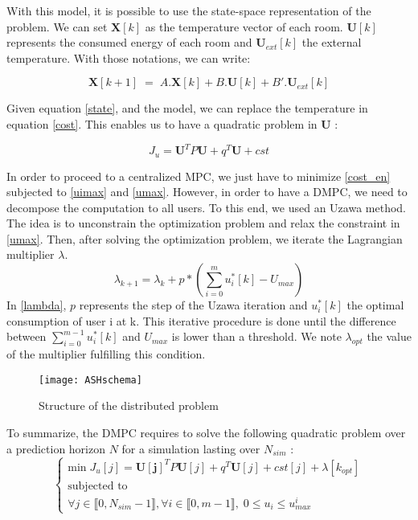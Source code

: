 \documentclass[conference, peerreview]{IEEEtran}
\begin{document}
With this model, it is possible to use the state-space representation of the problem. We can  set $\bm{X}[k]$ as the temperature vector of each room. $\bm{U}[k]$ represents the consumed energy of each room and $\bm{U}_{ext}[k]$ the external temperature. 
With those notations, we can write:

\begin{equation}
\bm{X}[k+1]\; = \; A . \bm{X}[k] + B .\bm{U}[k] + B'.\bm{U}_{ext}[k]
\label{state}
\end{equation}

Given equation \ref{state}, and the model, we can replace the temperature in equation \ref{cost}. This enables us to have a quadratic problem in $\bm{U}$ :

\begin{equation}
J_u = \bm{U}^T P \bm{U} + q^T \bm{U} + cst 
\label{cost_en}
\end{equation}

In order to proceed to a centralized MPC, we just have to minimize \ref{cost_en} subjected to \ref{uimax} and \ref{umax}. However, in order to have a DMPC, we need to decompose the computation to all users. To this end, we used an Uzawa method. The idea is to unconstrain  the optimization problem and relax the constraint in \ref{umax}. Then, after solving the optimization problem, we iterate the Lagrangian multiplier $\lambda$.
\begin{equation}
\lambda_{k+1} = \lambda_k + p * (\sum_{i=0}^m u_i^*[k] - U_{max})
\label{lambda}
\end{equation}
In \ref{lambda}, $p$ represents the step of the Uzawa iteration and $u_i^*[k]$ the optimal consumption of user i at k. This iterative procedure is done until the difference between $\sum_{i=0}^{m-1} u_i^*[k]$ and  $U_{max}$ is lower than a threshold. We note $\lambda_{opt}$ the value of the multiplier fulfilling this condition.

\begin{figure}[!t]
\centering
\texttt{[image: ASHschema]}
\caption{Structure of the distributed problem}
\label{coord}
\end{figure}
To summarize, the DMPC requires to solve the following quadratic problem over a prediction horizon $N$ for a simulation lasting over $N_{sim}$ :
\begin{equation}
\left\{
\begin{array}{l}
\text{min} \; J_u[j] =   \bm{U[j]}^T P \bm{U}[j] + q^T \bm{U}[j] + cst[j] + \lambda[k_{opt}]  \\
\text{subjected to}\\
\forall j  \in \llbracket 0, N_{sim}-1 \rrbracket, \forall i \in \llbracket 0, m -1 \rrbracket, \; 0 \leq  u_i \leq  u_{max}^i
\end{array}
\right.
\label{QP}
\end{equation}
\end{document}

